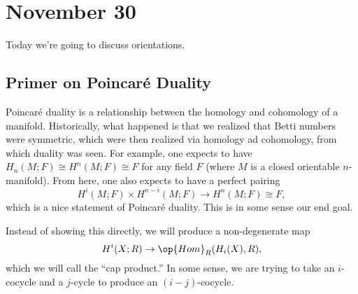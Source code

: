 \documentclass[../notes.tex]{subfiles}
\begin{document}
\section{November 30}

Today we're going to discuss orientations.

\subsection{Primer on Poincar\'e Duality}
Poincar\'e duality is a relationship between the homology and cohomology of a manifold. Historically, what happened is that we realized that Betti numbers were symmetric, which were then realized via homology ad cohomology, from which duality was seen. For example, one expects to have $H_n(M;F)\cong H^n(M;F)\cong F$ for any field $F$ (where $M$ is a closed orientable $n$-manifold). From here, one also expects to have a perfect pairing
\[H^i(M;F)\times H^{n-i}(M;F)\to H^n(M;F)\cong F,\]
which is a nice statement of Poincar\'e duality. This is in some sense our end goal.

Instead of showing this directly, we will produce a non-degenerate map
\[H^i(X;R)\to\op{Hom}_R(H_i(X),R),\]
which we will call the ``cap product.'' In some sense, we are trying to take an $i$-cocycle and a $j$-cycle to produce an $(i-j)$-cocycle.
\end{document}
